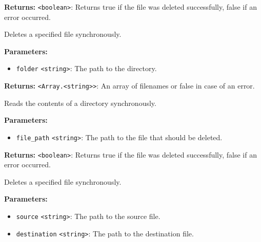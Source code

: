 \documentclass[12pt,a4paper]{article}
\begin{document}
\noindent \textbf{Returns:} \texttt{<boolean>}: Returns true if the file was deleted successfully, false if an error occurred.

\noindent Deletes a specified file synchronously.

\vspace{5mm}
\noindent {}


\noindent \textbf{Parameters:}
\begin{itemize}
  \item \texttt{folder} \texttt{<string>}: The path to the directory.
\end{itemize}

\noindent \textbf{Returns:} \texttt{<Array.<string>>}: An array of filenames or false in case of an error.

\noindent Reads the contents of a directory synchronously.

\vspace{5mm}
\noindent {}


\noindent \textbf{Parameters:}
\begin{itemize}
  \item \texttt{file\_path} \texttt{<string>}: The path to the file that should be deleted.
\end{itemize}

\noindent \textbf{Returns:} \texttt{<boolean>}: Returns true if the file was deleted successfully, false if an error occurred.

\noindent Deletes a specified file synchronously.

\vspace{5mm}
\noindent {}


\noindent \textbf{Parameters:}
\begin{itemize}
  \item \texttt{source} \texttt{<string>}: The path to the source file.
  \item \texttt{destination} \texttt{<string>}: The path to the destination file.
\end{itemize}
\end{document}
